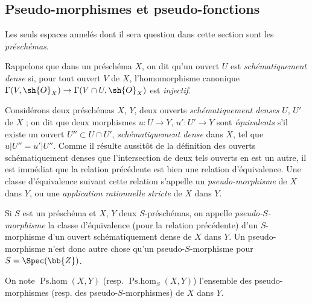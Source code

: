 \subsection{Pseudo-morphismes et pseudo-fonctions}
\label{IV.20.2}

Les seuls espaces annelés dont il sera question dans cette section sont les \emph{préschémas}.

\begin{env}[20.2.1]
\label{IV.20.2.1}
Rappelons  que dans un préschéma $X$, on dit qu'un ouvert $U$ est \emph{schématiquement dense} si, pour tout ouvert $V$ de $X$, l'homomorphisme canonique $\Gamma(V,\sh{O}_X)\to\Gamma(V\cap U,\sh{O}_X)$ est \emph{injectif}.

Considérons deux préschémas $X$, $Y$, deux ouverts \emph{schématiquement denses} $U$, $U'$ de $X$ ; on dit que deux morphismes $u:U\to Y$, $u':U'\to Y$ sont \emph{équivalents} s'il existe un ouvert $U''\subset U\cap U'$, \emph{schématiquement dense} dans $X$, tel que $u|U''=u'|U''$.
Comme il résulte aussitôt de la définition des ouverts schématiquement denses que l'intersection de deux tels ouverts en est un autre, il est immédiat que la relation précédente est bien une relation d'équivalence.
Une classe d'équivalence suivant cette relation s'appelle un \emph{pseudo-morphisme} de $X$ dans $Y$, ou une \emph{application rationnelle stricte} de $X$ dans $Y$.

Si $S$ est un préschéma et $X$, $Y$ deux $S$-préschémas, on appelle \emph{pseudo-$S$-morphisme} la classe d'équivalence (pour la relation précédente) d'un $S$-morphisme d'un ouvert schématiquement dense de $X$ dans $Y$.
Un pseudo-morphisme n'est donc autre chose qu'un pseudo-$S$-morphisme pour $S=\Spec(\bb{Z})$.

On note $\operatorname{Ps.hom}(X,Y)$ (resp. $\operatorname{Ps.hom}_S(X,Y)$) l'ensemble des pseudo-morphismes (resp. des pseudo-$S$-morphismes) de $X$ dans $Y$.
\end{env}

